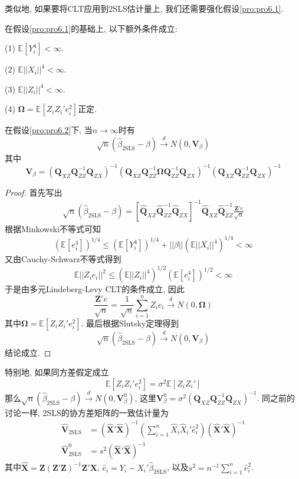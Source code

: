 \documentclass[cn, 12pt, math=mtpro2, bibstyle=apa, blue, twocol]{elegantbook}
\newcommand{\E}{\mathbb{E}}
\newcommand{\Q}{\mathbold{Q}}
\newcommand{\X}{\mathbold{X}}
\newcommand{\Z}{\mathbold{Z}}
\newcommand{\hb}{\hat{\beta}}
\newcommand{\V}{\mathbold{V}}
\newcommand{\BO}{\mathbold{\Omega}}
\begin{document}
类似地, 如果要将CLT应用到2SLS估计量上, 我们还需要强化假设\ref{pro:pro6.1}.
\begin{proposition}\label{pro:pro6.2}
在假设\ref{pro:pro6.1}的基础上, 以下额外条件成立:

(1) $\E[Y_i^4]<\infty$.

(2) $\E||X_i||^4<\infty$.

(3) $\E||Z_i||^4<\infty$.

(4) $\mathbold{\Omega}=\E[Z_iZ_i'e_i^2]$正定.
\end{proposition}
\begin{theorem}
  在假设\ref{pro:pro6.2}下, 当$n\to\infty$时有
  $$\sqrt{n}(\hb_{\text{2SLS}}-\beta)\xrightarrow{d}N(0,\V_\beta)$$
  其中
  $$\V_\beta=(\Q_{XZ}\Q_{ZZ}^{-1}\Q_{ZX})^{-1}(\Q_{XZ}\Q_{ZZ}^{-1}\BO\Q_{ZZ}^{-1}\Q_{ZX})^{-1}(\Q_{XZ}\Q_{ZZ}^{-1}\Q_{ZX})^{-1}$$
\end{theorem}
\begin{proof}
  首先写出
  \begin{align*}
  \sqrt{n}(\hb_{\text{2SLS}}-\beta)=[\hat{\Q}_{XZ}\hat{\Q}_{ZZ}^{-1}\hat{\Q}_{ZX}]^{-1}\hat{\Q}_{XZ}\hat{\Q}_{ZZ}^{-1}\frac{\Z'e}{\sqrt{n}}
  \end{align*}
  根据Minkowski不等式可知
  $$(\E[e_i^4])^{1/4}\leq (\E[Y_i^4])^{1/4}+||\beta||(\E||X_i||^4)^{1/4}<\infty$$
  又由Cauchy-Schwarz不等式得到
  $$\E||Z_ie_i||^2\leq(\E||Z_i||^4)^{1/2}(\E[e_i^4])^{1/2}<\infty$$
  于是由多元Lindeberg-Levy CLT的条件成立, 因此
  $$\frac{\Z'e}{\sqrt{n}}=\frac{1}{\sqrt{n}}\sum_{i=1}^{n}Z_ie_i\xrightarrow{d}N(0,\BO)$$
  其中$\BO=\E[Z_iZ_i'e_i^2]$. 最后根据Slutsky定理得到
  $$\sqrt{n}(\hb_{\text{2SLS}}-\beta)\xrightarrow{d}N(0,\V_\beta)$$
  结论成立.

\end{proof}
特别地, 如果同方差假定成立
\begin{equation}\label{eq6.21}
  \E[Z_iZ_i'e_i^2]=\sigma^2\E[Z_iZ_i']
\end{equation}
那么$\sqrt{n}(\hb_{\text{2SLS}}-\beta)\xrightarrow{d}N(0,\V_\beta^0)$, 这里$\V_\beta^0=\sigma^2(\Q_{XZ}\Q_{ZZ}^{-1}\Q_{ZX})^{-1}$. 同之前的讨论一样, 2SLS的协方差矩阵的一致估计量为
\begin{align*}
\hat{\V}_{\text{2SLS}}&=(\hat{\X}'\hat{\X})^{-1}\left(\sum_{i=1}^{n}\hat{X}_i\hat{X}_i'\hat{e}_i^2\right)(\hat{\X}'\hat{\X})^{-1} \\
\hat{\V}_{\text{2SLS}}^0&=s^2(\hat{\X}'\hat{\X})^{-1}
\end{align*}
其中$\hat{\X}=\Z(\Z'\Z)^{-1}\Z'\X$, $\hat{e}_i=Y_i-X_i'\hat{\beta}_{\text{2SLS}}$, 以及$s^2=n^{-1}\sum_{i=1}^{n}\hat{e}_i^2$.
\end{document}
